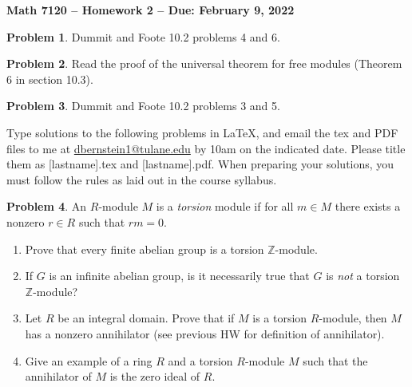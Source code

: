 \documentclass[letterpaper,11pt]{amsart}
\theoremstyle{plain}
\theoremstyle{definition}
\newtheorem{pr}{Problem}
\theoremstyle{remark}
\begin{document}
\Large

\begin{center}
{\bf Math 7120 -- Homework  2 --  Due:  February 9, 2022}
\end{center}

\normalsize

\medskip


\begin{pr}
    Dummit and Foote 10.2 problems 4 and 6.
\end{pr}

\begin{pr}
    Read the proof of the universal theorem for free modules (Theorem 6 in section 10.3).
\end{pr}


\begin{pr}
    Dummit and Foote 10.2 problems 3 and 5.
\end{pr}


\bigskip

Type solutions to the following problems in \LaTeX, and email the tex and PDF files to me at \url{dbernstein1@tulane.edu} by 10am on the indicated date.
Please title them as [lastname].tex and [lastname].pdf.
When preparing your solutions, you must follow the rules as laid out in the course syllabus.

\vspace{.5cm}



\begin{pr}
    An $R$-module $M$ is a \emph{torsion} module if for all $m\in M$ there exists a nonzero $r \in R$ such that $rm = 0$.
    \begin{enumerate}
        \item Prove that every finite abelian group is a torsion $\mathbb{Z}$-module.
        \item If $G$ is an infinite abelian group, is it necessarily true that $G$ is \emph{not} a torsion $\mathbb{Z}$-module?
        \item Let $R$ be an integral domain. Prove that if $M$ is a torsion $R$-module, then $M$ has a nonzero annihilator (see previous HW for definition of annihilator).
        \item Give an example of a ring $R$ and a torsion $R$-module $M$ such that the annihilator of $M$ is the zero ideal of $R$.
    \end{enumerate}
\end{pr}
\end{document}
